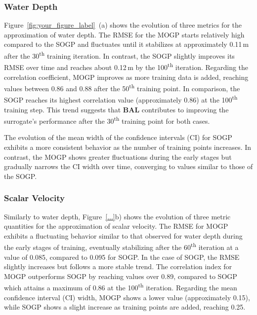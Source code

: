 \documentclass[draft,linenumbers,onecolumn]{agujournal2019} %
\begin{document}
\subsubsection{Water Depth}
Figure~\ref{fig:your_figure_label}~(a) shows the evolution of three metrics for the approximation of water depth. The RMSE for the MOGP starts relatively high compared to the SOGP and fluctuates until it stabilizes at approximately 0.11\,m after the 30\textsuperscript{th} training iteration. In contrast, the SOGP slightly improves its RMSE over time and reaches about 0.12\,m by the 100\textsuperscript{th} iteration.
Regarding the correlation coefficient, MOGP improves as more training data is added, reaching values between 0.86 and 0.88 after the 50\textsuperscript{th} training point. In comparison, the SOGP reaches its highest correlation value (approximately 0.86) at the 100\textsuperscript{th} training step. This trend suggests that \textbf{BAL} contributes to improving the surrogate’s performance after the 30\textsuperscript{th} training point for both cases.

The evolution of the mean width of the confidence intervals (CI) for SOGP exhibits a more consistent behavior as the number of training points increases. In contrast, the MOGP shows greater fluctuations during the early stages but gradually narrows the CI width over time, converging to values similar to those of the SOGP.

\subsubsection{Scalar Velocity}
Similarly to water depth, Figure~\ref{...}b) shows the evolution of three metric quantities for the approximation of scalar velocity. The RMSE for MOGP exhibits a fluctuating behavior similar to that observed for water depth during the early stages of training, eventually stabilizing after the 60\textsuperscript{th} iteration at a value of 0.085, compared to 0.095 for SOGP. In the case of SOGP, the RMSE slightly increases but follows a more stable trend. The correlation index for MOGP outperforms SOGP by reaching values over 0.89, compared to SOGP which attains a maximum of 0.86 at the 100\textsuperscript{th} iteration. Regarding the mean confidence interval (CI) width, MOGP shows a lower value (approximately 0.15), while SOGP shows a slight increase as training points are added, reaching 0.25.
\end{document}

